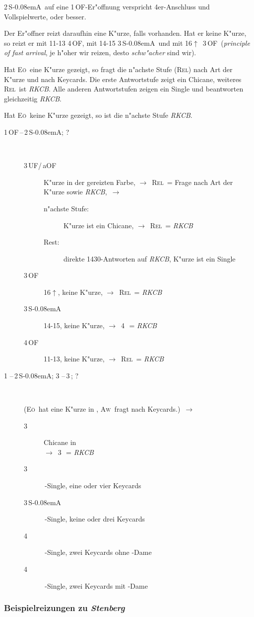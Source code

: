 \documentclass[11pt,german,twocolumn]{scrartcl}
\renewcommand{\Cl}{{\color{ClColor}{\clubs}}}
\renewcommand{\Di}{{\color{DiColor}{\sdiamonds}}}
\renewcommand{\He}{{\color{HeColor}{\shearts}}}
\renewcommand{\Sp}{{\color{SpColor}{\spades}}}
\def\pik{\,\Sp}
\def\coe{\,\He}
\def\kar{\,\Di}
\def\tre{\,\Cl}
\def\co{\He}
\def\tr{\Cl}
\def\ra{$\rightarrow$}
\def\pl{$\uparrow$}
\def\uf{\textsf{\,UF}}
\def\of{\textsf{\,OF}}
\def\aof{\textsf{\,aOF}}
\def\sa{\textsf{S\kern-0.08emA}}
\def\SA{\,\sa}
\def\sep{\,--\,}
\newcommand{\conv}[1]{\emph{#1}}
\def\rel{\textsc{Rel}}
\def\aw{\textsc{Aw}}
\def\eo{\textsc{E\"o}}
\def\bdsc{\begin{description}}
\def\edsc{\end{description}}
\begin{document}
2\SA\ auf eine 1\of-Er"offnung verspricht 4er-Anschluss und
Vollspielwerte, oder besser.

Der Er"offner reizt daraufhin eine K"urze, falls vorhanden. Hat er
keine K"urze, so reizt er mit 11-13 4\of, mit 14-15 3\SA\ und mit
16\pl\ 3\of\ (\conv{principle of fast arrival}, je h"oher wir reizen,
desto \emph{schw"acher} sind wir).

Hat \eo\ eine K"urze gezeigt, so fragt die n"achste Stufe (\rel) nach
Art der K"urze und nach Keycards.  Die erste Antwortstufe zeigt ein
Chicane, weiteres \rel\ ist \conv{RKCB}.  Alle anderen Antwortstufen
zeigen ein Single und beantworten gleichzeitig \conv{RKCB}.

Hat \eo\ keine K"urze gezeigt, so ist die n"achste Stufe \conv{RKCB}.

\bdsc
\item[1\of\sep2\SA; ?]~
  \bdsc
  \item[3\uf/\aof] K"urze in der gereizten Farbe, \ra~\rel\ = Frage
    nach Art der K"urze sowie \conv{RKCB},~\ra
    \bdsc
    \item[n"achste Stufe:] K"urze ist ein Chicane, \ra~\rel\ = \conv{RKCB}
    \item[Rest:] direkte 1430-Antworten auf
      \conv{RKCB}, K"urze ist ein Single
    \edsc
  \item[3\of] 16\pl, keine K"urze, \ra~\rel\ = \conv{RKCB}
  \item[3\SA] 14-15, keine K"urze, \ra~4\tre\ = \conv{RKCB}
  \item[4\of] 11-13, keine K"urze, \ra~\rel\ = \conv{RKCB}
  \edsc
\item[1\coe\sep2\SA; 3\tre\sep3\kar; ?]~

  (\eo\ hat eine K"urze in \tr, \aw\ fragt nach Keycards.)~\ra
  \bdsc
  \item[3\coe] Chicane in \tre\\
    \ra~3\pik\ = \conv{RKCB}
  \item[3\pik] \tre-Single, eine oder vier Keycards
  \item[3\SA] \tre-Single, keine oder drei Keycards
  \item[4\tre] \tre-Single, zwei Keycards ohne \co-Dame
  \item[4\kar] \tre-Single, zwei Keycards mit \co-Dame
  \edsc
\edsc

\subsubsection{Beispielreizungen zu \conv{Stenberg}}
\end{document}

